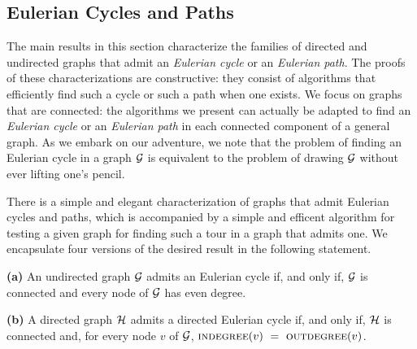 
\subsection{Eulerian Cycles and Paths}
\label{sec:EulerianCycle}

The main results in this section characterize the families of directed
and undirected graphs that admit an {\it Eulerian cycle} or an {\it
  Eulerian path}.  The proofs of these characterizations are
constructive: they consist of algorithms that efficiently find such a
cycle or such a path when one exists.  We focus on graphs that are
connected: the algorithms we present can actually be adapted to find
an {\it Eulerian cycle} or an {\it Eulerian path} in each connected
component of a general graph.  As we embark on our adventure, we note
that the problem of finding an Eulerian cycle in a graph $\mbox{$\cal G$}$ is
equivalent to the problem of drawing $\mbox{$\cal G$}$ without ever lifting one's
pencil. 


There is a simple and elegant characterization of graphs that admit
Eulerian cycles and paths, which is accompanied by a simple and
efficent algorithm for testing a given graph for finding such a tour
in a graph that admits one.  We encapsulate four versions of the
desired result in the following statement.

\begin{prop}
\label{thm:eulerian-cycle}
{\bf (a)}
An undirected graph $\mbox{$\cal G$}$ admits an Eulerian cycle if, and only if,
$\mbox{$\cal G$}$ is connected and every node of $\mbox{$\cal G$}$ has even degree.

{\bf (b)}
A directed graph $\mbox{$\cal H$}$ admits a directed Eulerian cycle if, and only if,
$\mbox{$\cal H$}$ is connected and, for every node $v$ of $\mbox{$\cal G$}$,
$\mbox{\sc indegree}(v) \ = \ \mbox{\sc outdegree}(v)$.
\end{prop}

